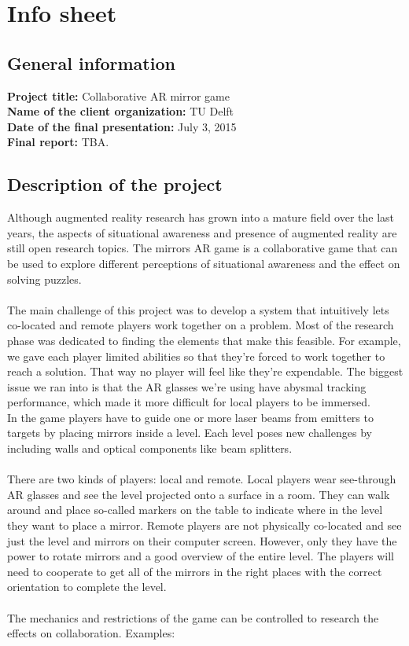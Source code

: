 \chapter{Info sheet} \label{app:infosheet}

\section*{General information}
\textbf{Project title:} Collaborative AR mirror game\\
\textbf{Name of the client organization:} TU Delft\\
\textbf{Date of the final presentation:} July 3, 2015\\
\textbf{Final report:} TBA.

\section*{Description of the project}
Although augmented reality research has grown into a mature field over the last
years, the aspects of situational awareness and presence of augmented reality
are still open research topics. The mirrors AR game is a collaborative game that
can be used to explore different perceptions of situational awareness and the
effect on solving puzzles. \\
\\
The main challenge of this project was to develop a system that intuitively lets
co-located and remote players work together on a problem. Most of the research
phase was dedicated to finding the elements that make this feasible. For
example, we gave each player limited abilities so that they're forced to work
together to reach a solution. That way no player will feel like they're
expendable. The biggest issue we ran into is that the AR glasses we're using
have abysmal tracking performance, which made it more difficult for local
players to be immersed.
\\
In the game players have to guide one or more laser beams from emitters to
targets by placing mirrors inside a level. Each level poses new challenges by
including walls and optical components like beam splitters. \\
\\
There are two kinds of players: local and remote. Local players wear see-through
AR glasses and see the level projected onto a surface in a room. They can walk
around and place so-called markers on the table to indicate where in the level
they want to place a mirror. Remote players are not physically co-located and
see just the level and mirrors on their computer screen. However, only they have
the power to rotate mirrors and a good overview of the entire level. The players
will need to cooperate to get all of the mirrors in the right places with the
correct orientation to complete the level. \\
\\
The mechanics and restrictions of the game can be controlled to research the
effects on collaboration. Examples:

